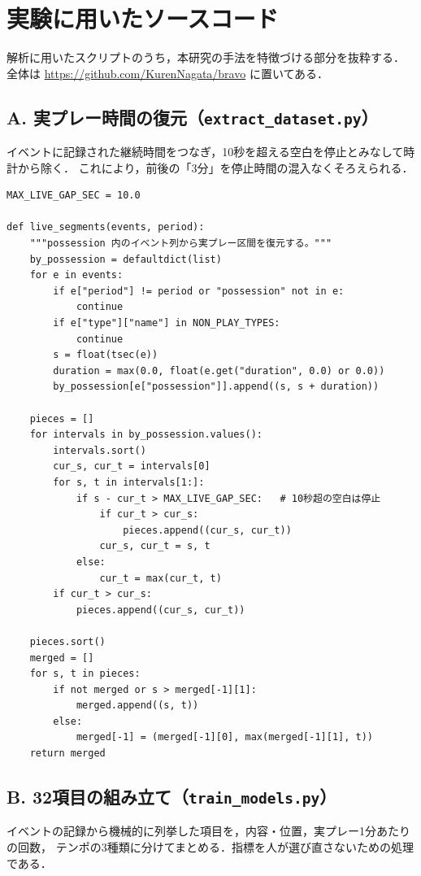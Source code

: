 \section*{実験に⽤いたソースコード}

解析に用いたスクリプトのうち，本研究の手法を特徴づける部分を抜粋する．
全体は \url{https://github.com/KurenNagata/bravo} に置いてある．

\subsection*{A. 実プレー時間の復元（\texttt{extract\_dataset.py}）}

イベントに記録された継続時間をつなぎ，10秒を超える空白を停止とみなして時計から除く．
これにより，前後の「3分」を停止時間の混入なくそろえられる．

\begin{verbatim}
MAX_LIVE_GAP_SEC = 10.0

def live_segments(events, period):
    """possession 内のイベント列から実プレー区間を復元する。"""
    by_possession = defaultdict(list)
    for e in events:
        if e["period"] != period or "possession" not in e:
            continue
        if e["type"]["name"] in NON_PLAY_TYPES:
            continue
        s = float(tsec(e))
        duration = max(0.0, float(e.get("duration", 0.0) or 0.0))
        by_possession[e["possession"]].append((s, s + duration))

    pieces = []
    for intervals in by_possession.values():
        intervals.sort()
        cur_s, cur_t = intervals[0]
        for s, t in intervals[1:]:
            if s - cur_t > MAX_LIVE_GAP_SEC:   # 10秒超の空白は停止
                if cur_t > cur_s:
                    pieces.append((cur_s, cur_t))
                cur_s, cur_t = s, t
            else:
                cur_t = max(cur_t, t)
        if cur_t > cur_s:
            pieces.append((cur_s, cur_t))

    pieces.sort()
    merged = []
    for s, t in pieces:
        if not merged or s > merged[-1][1]:
            merged.append((s, t))
        else:
            merged[-1] = (merged[-1][0], max(merged[-1][1], t))
    return merged
\end{verbatim}

\subsection*{B. 32項目の組み立て（\texttt{train\_models.py}）}

イベントの記録から機械的に列挙した項目を，内容・位置，実プレー1分あたりの回数，
テンポの3種類に分けてまとめる．指標を人が選び直さないための処理である．

